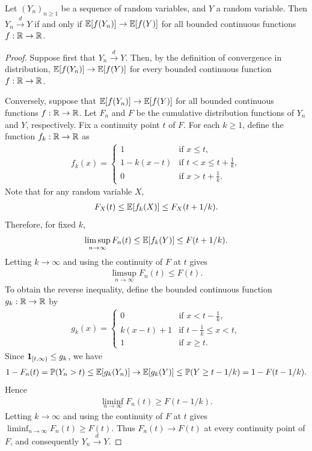 \begin{lemma}
    Let $(Y_{n})_{n \geq 1}$ be a sequence of random variables, and $Y$ a random variable. Then $Y_{n} \xrightarrow{d} Y$ if and only if $\mathbb{E}[f(Y_{n})] \to \mathbb{E}[f(Y)]$ for all bounded continuous functions $f:\mathbb{R} \to \mathbb{R}$.
\end{lemma}
\begin{proof}
    Suppose first that $Y_{n} \xrightarrow{d} Y$. Then, by the definition of convergence in distribution, $\mathbb{E}[f(Y_{n})] \to \mathbb{E}[f(Y)]$ for every bounded continuous function $f:\mathbb{R} \to \mathbb{R}$.

    Conversely, suppose that $\mathbb{E}[f(Y_{n})] \to \mathbb{E}[f(Y)]$ for all bounded continuous functions $f:\mathbb{R} \to \mathbb{R}$. Let $F_{n}$ and $F$ be the cumulative distribution functions of $Y_{n}$ and $Y$, respectively. Fix a continuity point $t$ of $F$. For each $k \geq 1$, define the function $f_{k}:\mathbb{R} \to \mathbb{R}$ as
    \begin{align}
        f_{k}(x) = \begin{cases}
            1 &\text{if } x \leq t, \\
            1-k(x-t) &\text{if } t < x \leq t+\frac{1}{k}, \\
            0 &\text{if } x > t+\frac{1}{k}.
        \end{cases}
    \end{align}
    Note that for any random variable $X$,
    \begin{align}
        F_{X}(t) \leq \mathbb{E}[f_{k}(X)] \leq F_{X}(t+1/k).
    \end{align}
    Therefore, for fixed $k$,
    \begin{align}
        \limsup_{n\to\infty}F_{n}(t) \leq \mathbb{E}[f_{k}(Y)] \leq F(t+1/k).
    \end{align}
    Letting $k\to\infty$ and using the continuity of $F$ at $t$ gives
    \begin{align}
        \limsup_{n\to\infty}F_{n}(t) \leq F(t).
    \end{align}
    To obtain the reverse inequality, define the bounded continuous function $g_{k}:\mathbb{R}\to\mathbb{R}$ by
    \begin{align}
        g_{k}(x) = \begin{cases}
            0 &\text{if } x < t-\frac{1}{k},\\
            k(x-t)+1 &\text{if } t-\frac{1}{k} \leq x < t,\\
            1 &\text{if } x \geq t.
        \end{cases}
    \end{align}
    Since $\textbf{1}_{[t,\infty)}\leq g_{k}$, we have
    \begin{align}
        1-F_{n}(t) = \mathbb{P}(Y_{n}>t) \leq \mathbb{E}[g_{k}(Y_{n})] \to \mathbb{E}[g_{k}(Y)] \leq \mathbb{P}(Y\geq t-1/k)=1-F(t-1/k).
    \end{align}
    Hence
    \begin{align}
        \liminf_{n\to\infty}F_{n}(t) \geq F(t-1/k).
    \end{align}
    Letting $k\to\infty$ and using the continuity of $F$ at $t$ gives $\liminf_{n\to\infty}F_{n}(t)\geq F(t)$. Thus $F_{n}(t)\to F(t)$ at every continuity point of $F$, and consequently $Y_{n}\xrightarrow{d}Y$.
\end{proof}

